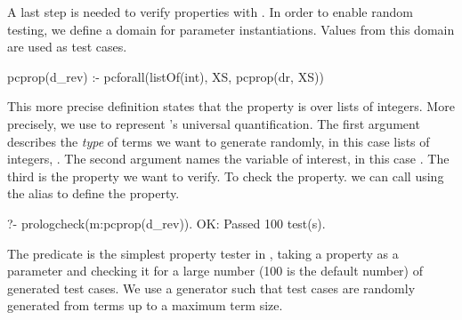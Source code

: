 A last step is needed %
to verify properties with \plqc{}.
%
In order to enable random testing, we
define a domain for parameter instantiations.
Values from this domain are used as test cases.
%
\begin{yapcode}
 pcprop(d_rev) :- pcforall(listOf(int), XS, pcprop({dr, XS}))
\end{yapcode}
%


This more precise definition %
states that the property  is 
over lists of integers.%
%
More precisely, we use  to represent \plqc{}'s universal quantification.
%
The first argument describes the \emph{type} of terms we want to
generate randomly, in this case lists of integers,
.
%
The second argument names the variable of interest, in this case .
%
The third %
is
the property we want to verify.
%
%
To
check the property.
%
we can call
 \plqc{} using the alias
 to define the property.
\begin{yapcode}
   ?- prologcheck(m:pcprop(d_rev)).
 OK: Passed 100 test(s).
\end{yapcode}
%
The  predicate is the simplest property tester in
\plqc{}, taking a property as a parameter and checking it for a large
number (100 is the default number) of generated test cases.
%
We use a generator such that test cases are randomly generated from
terms up to a maximum term size.

